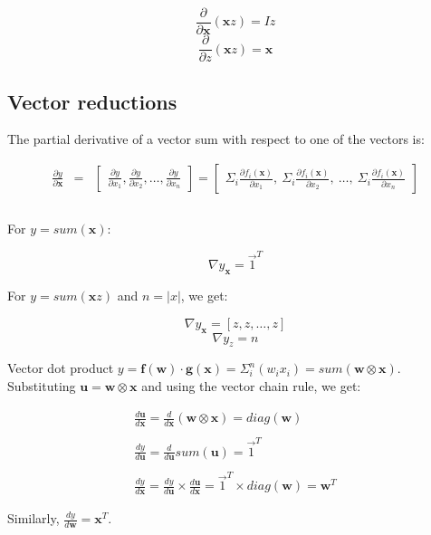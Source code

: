 \documentclass[11pt]{article}
\begin{document}
\[\frac{\partial}{\partial \mathbf{x}} ( \mathbf{x} z ) = I z\]
\[\frac{\partial}{\partial z} ( \mathbf{x} z ) = \mathbf{x}\]

\subsection{Vector reductions}

The partial derivative of a vector sum with respect to one of the vectors is:

\[
\begin{array}{lcl}
\frac{\partial y}{\partial \mathbf{x}} & = & \begin{bmatrix} \frac{\partial y}{\partial x_1}, \frac{\partial y}{\partial x_2}, \ldots, \frac{\partial y}{\partial x_n} \end{bmatrix} = \begin{bmatrix} \Sigma_i \frac{\partial f_i(\mathbf{x})}{\partial x_1},~ \Sigma_i \frac{\partial f_i(\mathbf{x})}{\partial x_2},~ \ldots,~ \Sigma_i \frac{\partial f_i(\mathbf{x})}{\partial x_n}  \end{bmatrix}\\\\
\end{array}
\]

For $y = sum(\mathbf{x})$:

\[\nabla y_\mathbf{x} = \vec{1}^T\]

For $y = sum(\mathbf{x}z)$ and $n = |x|$, we get:

\[\nabla y_\mathbf{x} = [z, z, \ldots, z]\]
\[\nabla y_z = n \]

Vector dot product $y = \mathbf{f(w)} \cdot \mathbf{g(x)} = \Sigma_i^n (w_i x_i) = sum(\mathbf{w} \otimes \mathbf{x})$.  Substituting $\mathbf{u} = \mathbf{w} \otimes \mathbf{x}$ and using the vector chain rule, we get:

\[
\begin{array}{lcl}
\frac{d \mathbf{u}}{d\mathbf{x}} = \frac{d}{d\mathbf{x}} (\mathbf{w} \otimes \mathbf{x}) = diag(\mathbf{w})\\\\
\frac{dy}{d\mathbf{u}} = \frac{d}{d\mathbf{u}} sum(\mathbf{u}) = \vec{1}^T\\\\
\frac{dy}{d\mathbf{x}} = \frac{dy}{d\mathbf{u}} \times \frac{d\mathbf{u}}{d\mathbf{x}} = \vec{1}^T \times diag(\mathbf{w}) = \mathbf{w}^T
\end{array}
\]

Similarly, $\frac{dy}{d\mathbf{w}} = \mathbf{x}^T$.
\end{document}
